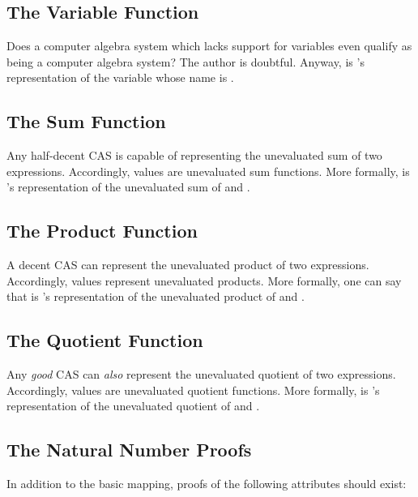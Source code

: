\documentclass{report}
\begin{document}
\subsection{The Variable Function}
Does a computer algebra system which lacks support for variables even qualify as being a computer algebra system?  The author is doubtful.  Anyway,    is 's representation of the variable whose name is .

\subsection{The Sum Function}
Any half-decent CAS is capable of representing the unevaluated sum of two expressions.  Accordingly,  values are unevaluated sum functions.  More formally,     is 's representation of the unevaluated sum of  and .

\subsection{The Product Function}
A decent CAS can represent the unevaluated product of two expressions.  Accordingly,  values represent unevaluated products.  More formally, one can say that     is 's representation of the unevaluated product of  and .

\subsection{The Quotient Function}
Any \emph{good} CAS can \emph{also} represent the unevaluated quotient of two expressions.  Accordingly,  values are unevaluated quotient functions.  More formally,     is 's representation of the unevaluated quotient of  and .

\subsection{The Natural Number Proofs}
In addition to the basic mapping, proofs of the following attributes should exist:
\end{document}
